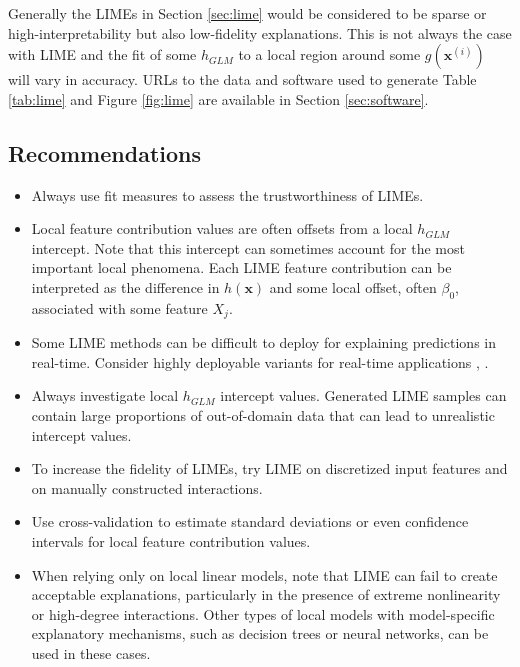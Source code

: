 \documentclass[11pt]{asaproc}
\begin{document}
Generally the LIMEs in Section \ref{sec:lime} would be considered to be sparse or high-interpretability but also low-fidelity explanations. This is not always the case with LIME and the fit of some $h_{GLM}$ to a local region around some $g(\mathbf{x}^{(i)})$ will vary in accuracy. URLs to the data and software used to generate Table \ref{tab:lime} and Figure \ref{fig:lime} are available in Section \ref{sec:software}.

\subsection{Recommendations}

\begin{itemize}
	
	\item Always use fit measures to assess the trustworthiness of LIMEs.

	\item Local feature contribution values are often offsets from a local $h_{GLM}$ intercept. Note that this intercept can sometimes account for the most important local phenomena. Each LIME feature contribution can be interpreted as the difference in $h(\mathbf{x})$ and some local offset, often $\beta_0$, associated with some feature $X_j$.

	\item Some LIME methods can be difficult to deploy for explaining predictions in real-time. Consider highly deployable variants for real-time applications \cite{h2o_mli_booklet}, \cite{lime-sup}.
		
	\item Always investigate local $h_{GLM}$ intercept values. Generated LIME samples can contain large proportions of out-of-domain data that can lead to unrealistic intercept values. 
		
	\item To increase the fidelity of LIMEs, try LIME on discretized input features and on manually constructed interactions.
	
	\item Use cross-validation to estimate standard deviations or even confidence intervals for local feature contribution values.
	
	\item When relying only on local linear models, note that LIME can fail to create acceptable explanations, particularly in the presence of extreme nonlinearity or high-degree interactions. Other types of local models with model-specific explanatory mechanisms, such as decision trees or neural networks, can be used in these cases. 
	
\end{itemize}
\end{document}
